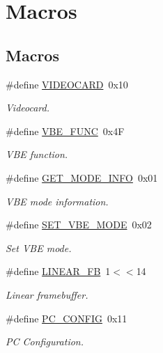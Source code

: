 \hypertarget{group__VBE}{}\section{Macros}
\label{group__VBE}
\subsection*{Macros}
\begin{DoxyCompactItemize}
\item 
\#define \hyperlink{group__VBE_ga025fb3d92475390b59a13c9bef8432fc}{V\+I\+D\+E\+O\+C\+A\+RD}~0x10
\begin{DoxyCompactList}\small\item\em Videocard. \end{DoxyCompactList}\item 
\#define \hyperlink{group__VBE_ga7b7e395b43446a244067eb5837854273}{V\+B\+E\+\_\+\+F\+U\+NC}~0x4F
\begin{DoxyCompactList}\small\item\em V\+BE function. \end{DoxyCompactList}\item 
\#define \hyperlink{group__VBE_ga0240cce19268c3ac2de090e8f718b89a}{G\+E\+T\+\_\+\+M\+O\+D\+E\+\_\+\+I\+N\+FO}~0x01
\begin{DoxyCompactList}\small\item\em V\+BE mode information. \end{DoxyCompactList}\item 
\#define \hyperlink{group__VBE_gab32156e1d72cb92b120bb16883c87eea}{S\+E\+T\+\_\+\+V\+B\+E\+\_\+\+M\+O\+DE}~0x02
\begin{DoxyCompactList}\small\item\em Set V\+BE mode. \end{DoxyCompactList}\item 
\#define \hyperlink{group__VBE_ga87dd568c1aab69cea6ccde662fe6806f}{L\+I\+N\+E\+A\+R\+\_\+\+FB}~1$<$$<$14
\begin{DoxyCompactList}\small\item\em Linear framebuffer. \end{DoxyCompactList}\item 
\#define \hyperlink{group__VBE_gac89ac3be66635d7f5643be86002c1f51}{P\+C\+\_\+\+C\+O\+N\+F\+IG}~0x11
\begin{DoxyCompactList}\small\item\em PC Configuration. \end{DoxyCompactList}\item 
$$
\end{DoxyCompactItemize}
